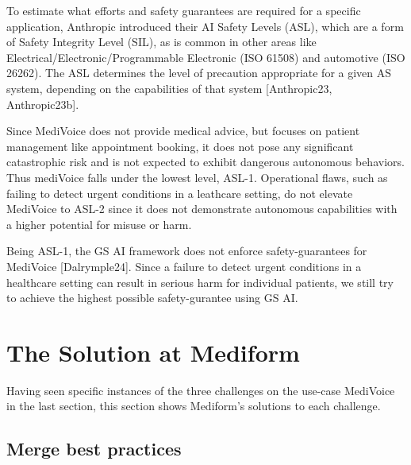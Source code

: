 \documentclass[twocolumn]{article}
\begin{document}
To estimate what efforts and safety guarantees are required for a specific application, 
Anthropic introduced their AI Safety Levels (ASL), which are a form of Safety Integrity Level (SIL),
as is common in other areas like Electrical/Electronic/Programmable Electronic (ISO 61508) and automotive (ISO 26262).
The ASL determines the level of precaution appropriate for a given AS system, depending on the capabilities of that system
[Anthropic23, Anthropic23b].

Since MediVoice does not provide medical advice, but focuses on patient management like appointment booking,
it does not pose any significant catastrophic risk and is not expected to exhibit dangerous autonomous behaviors.
Thus mediVoice falls under the lowest level, ASL-1.
Operational flaws, such as failing to detect urgent conditions in a leathcare setting,
do not elevate MediVoice to ASL-2 since it does not demonstrate autonomous capabilities with a higher potential for misuse or harm.

Being ASL-1, the GS AI framework does not enforce safety-guarantees for MediVoice [Dalrymple24].
Since a failure to detect urgent conditions in a healthcare setting can result in serious harm for individual patients,
we still try to achieve the highest possible safety-gurantee using GS AI.


\section{The Solution at Mediform}

Having seen specific instances of the three challenges on the use-case MediVoice in the last section, this section shows Mediform’s solutions to each challenge.

\subsection{Merge best practices}
\end{document}
